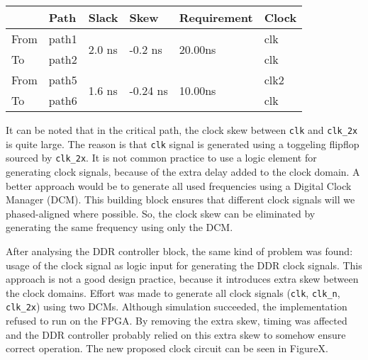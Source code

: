 \documentclass[final]{article}
\begin{document}
\begin{center}
\begin{tabular}{llllll}
     & Path  & Slack                     & Skew                        & Requirement                & Clock \\ \hline
From & path1 & \multirow{2}{3em}{2.0 ns} & \multirow{2}{3em}{-0.2 ns}  & \multirow{2}{3em}{20.00ns} & clk   \\
To   & path2 &                           &                             &                            & clk   \\ \hline
From & path5 & \multirow{2}{3em}{1.6 ns} & \multirow{2}{3em}{-0.24 ns} & \multirow{2}{3em}{10.00ns} & clk2  \\
To   & path6 &                           &                             &                            & clk   \\ \hline
\end{tabular}
\end{center}

It can be noted that in the critical path, the clock skew between \texttt{clk} and \texttt{clk\_2x} is quite large. The reason is that \texttt{clk} signal is generated using a toggeling flipflop sourced by \texttt{clk\_2x}. It is not common practice to use a logic element for generating clock signals, because of the extra delay added to the clock domain. A better approach would be to generate all used frequencies using a Digital Clock Manager (DCM). This building block ensures that different clock signals will we phased-aligned where possible. So, the clock skew can be eliminated by generating the same frequency using only the DCM.

After analysing the DDR controller block, the same kind of problem was found: usage of the clock signal as logic input for generating the DDR clock signals. This approach is not a good design practice, because it introduces extra skew between the clock domains. Effort was made to generate all clock signals (\texttt{clk}, \texttt{clk\_n}, \texttt{clk\_2x}) using two DCMs. Although simulation succeeded, the implementation refused to run on the FPGA. By removing the extra skew, timing was affected and the DDR controller probably relied on this extra skew to somehow ensure correct operation. The new proposed clock circuit can be seen in FigureX.
\end{document}
